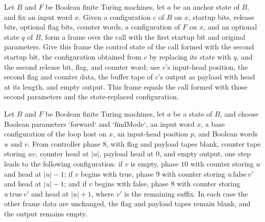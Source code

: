 \begin{lemma}
\label{Turing.FinTM.loopCall_reframe}
\leanok
{}
Let $B$ and $F$ be Boolean finite Turing machines, let $a$ be an anchor state of $B$,
and fix an input word $x$. Given a configuration $c$ of $B$ on $x$, startup bits,
release bits, optional flag bits, counter words, a configuration of $F$ on $x$, and an
optional state $q$ of $B$, form a frame over the call with the first startup bit and
original parameters. Give this frame the control state of the call formed with the
second startup bit, the configuration obtained from $c$ by replacing its state with $q$,
and the second release bit, flag, and counter word; use $c$'s input-head position, the
second flag and counter data, the buffer tape of $c$'s output as payload with head at
its length, and empty output. This frame equals the call formed with those second
parameters and the state-replaced configuration.
\end{lemma}

\begin{lemma}
\label{Turing.FinTM.loopHost_borrow_step}
\leanok
{}
Let $B$ and $F$ be Boolean finite Turing machines, let $a$ be a state of $B$, and choose
Boolean parameters `forward` and `findMode`, an input word $x$, a base configuration of
the loop host on $x$, an input-head position $p$, and Boolean words $u$ and $v$. From
controller phase $8$, with flag and payload tapes blank, counter tape storing $uv$,
counter head at $|u|$, payload head at $0$, and empty output, one step leads to the
following configuration: if $v$ is empty, phase $10$ with counter storing $u$ and head
at $|u|-1$; if $v$ begins with true, phase $9$ with counter storing
$u\,\mathrm{false}\,v'$ and head at $|u|-1$; and if $v$ begins with false, phase $8$
with counter storing $u\,\mathrm{true}\,v'$ and head at $|u|+1$, where $v'$ is the
remaining suffix. In each case the other frame data are unchanged, the flag and payload
tapes remain blank, and the output remains empty.
\end{lemma}

